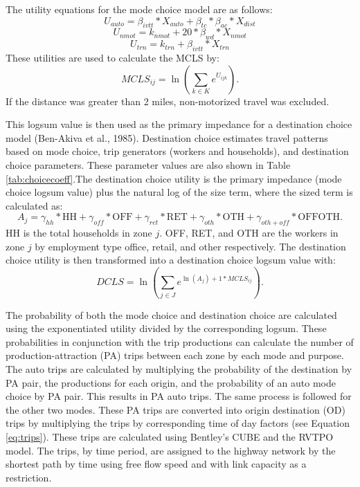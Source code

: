 \documentclass[fancy, masters, twoside]{byuthesis}
\begin{document}
The utility equations for the mode choice model are as follows:
\begin{equation}
U_{auto} = \beta_{ivtt} * X_{auto} + \beta_{tc} * \beta_{ac} * X_{dist}
\label{eq:driveutil}
\end{equation} \begin{equation}
U_{nmot} = k_{nmot} + 20 * \beta_{wd}*X_{nmot}
\label{eq:nonmoutil}
\end{equation} \begin{equation}
U_{trn} = k_{trn} + \beta_{ivtt} * X_{trn}
\label{eq:transutil}
\end{equation}
These utilities are used to calculate the MCLS by:
\begin{equation}
MCLS_{ij} = \ln(\sum_{k \in K} e^{U_{ijk}}).
\label{eq:mcls}
\end{equation}
If the distance was greater than 2 miles, non-motorized travel was excluded.

This logsum value is then used as the primary impedance for a destination choice model (Ben-Akiva et al., 1985). Destination choice estimates travel patterns based on mode choice, trip generators (workers and households), and destination choice parameters. These parameter values are also shown in Table \ref{tab:choicecoeff}.The destination choice utility is the primary impedance (mode choice logsum value) plus the natural log of the size term, where the sized term is calculated as:
\begin{equation}
A_j = \gamma_{hh} * \mathrm{HH} + \gamma_{off} * \mathrm{OFF} + \gamma_{ret} * \mathrm{RET} + \gamma_{oth} * \mathrm{OTH} + \gamma_{oth+off} * \mathrm{OFFOTH}.
\label{eq:dcsizeterm}
\end{equation}
HH is the total households in zone \(j\). OFF, RET, and OTH are the workers in zone \(j\) by employment type office, retail, and other respectively. The destination choice utility is then transformed into a destination choice logsum value with:
\begin{equation}
DCLS = \ln (\sum_{j \in J} e^{\ln(A_j) + 1* MCLS_{ij}}).
\label{eq:dcls}
\end{equation}

The probability of both the mode choice and destination choice are calculated using the exponentiated utility divided by the corresponding logsum. These probabilities in conjunction with the trip productions can calculate the number of production-attraction (PA) trips between each zone by each mode and purpose. The auto trips are calculated by multiplying the probability of the destination by PA pair, the productions for each origin, and the probability of an auto mode choice by PA pair. This results in PA auto trips. The same process is followed for the other two modes. These PA trips are converted into origin destination (OD) trips by multiplying the trips by corresponding time of day factors (see Equation \eqref{eq:trips}). These trips are calculated using Bentley's CUBE and the RVTPO model. The trips, by time period, are assigned to the highway network by the shortest path by time using free flow speed and with link capacity as a restriction.
\end{document}
